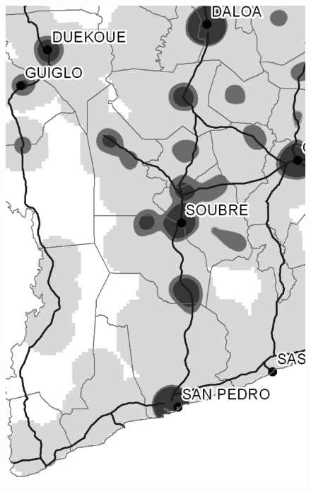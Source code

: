 \begin{figure}[h!]
{    \includegraphics[scale = 0.1]{results/images/kernel/l_hour18_kd_detail.pdf}
	\label{fig:subfig2_detail}
}
\subfigure[Wednesday, 19:00]{
}
\end{figure}
